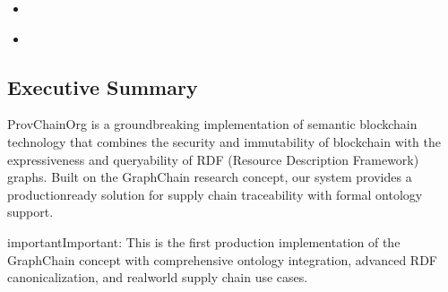 \documentclass[letterpaper,10pt,english]{sphinxmanual}
\begin{document}
\begin{sphinxShadowBox}
\begin{itemize}
\begin{itemize}
\end{itemize}

\item {} 
\sphinxAtStartPar
{}\label{\detokenize{overview/index:id19}}{\hyperref[\detokenize{overview/index:next-steps}]{}}

\item {} 
\sphinxAtStartPar
{}\label{\detokenize{overview/index:id20}}{\hyperref[\detokenize{overview/index:research-context}]{}}

\end{itemize}
\end{sphinxShadowBox}


\subsection{Executive Summary}
\label{\detokenize{overview/index:executive-summary}}
\sphinxAtStartPar
ProvChainOrg is a groundbreaking implementation of semantic blockchain technology that combines the security and immutability of blockchain with the expressiveness and queryability of RDF (Resource Description Framework) graphs. Built on the GraphChain research concept, our system provides a production\sphinxhyphen{}ready solution for supply chain traceability with formal ontology support.

\begin{sphinxadmonition}{important}{Important:}
\sphinxAtStartPar
This is the first production implementation of the GraphChain concept with comprehensive ontology integration, advanced RDF canonicalization, and real\sphinxhyphen{}world supply chain use cases.
\end{sphinxadmonition}
\end{document}
